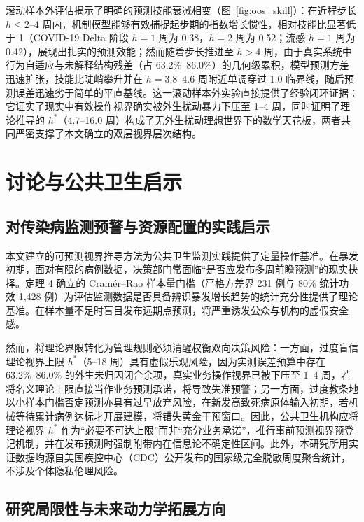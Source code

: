 \documentclass[11pt,a4paper]{article}
\theoremstyle{plain}
\theoremstyle{definition}
\begin{document}
滚动样本外评估揭示了明确的预测技能衰减相变（图~\ref{fig:oos_skill}）：在近程步长 $h \le 2\text{--}4$ 周内，机制模型能够有效捕捉起步期的指数增长惯性，相对技能比显著低于 1（COVID-19 Delta 阶段 $h=1$ 周为 0.38，$h=2$ 周为 0.52；流感 $h=1$ 周为 0.42），展现出扎实的预测效能；然而随着步长推进至 $h > 4$ 周，由于真实系统中行为自适应与未解释结构残差（占 63.2\%--86.0\%）的几何级累积，模型预测方差迅速扩张，技能比陡峭攀升并在 $h = 3.8\text{--}4.6$ 周附近单调穿过 1.0 临界线，随后预测误差迅速劣于简单的平直基线。这一滚动样本外实验直接提供了经验闭环证据：它证实了现实中有效操作视界确实被外生扰动暴力下压至 1--4 周，同时证明了理论推导的 $h^*$（4.7--16.0 周）构成了无外生扰动理想世界下的数学天花板，两者共同严密支撑了本文确立的双层视界层次结构。

\section{讨论与公共卫生启示}

\subsection{对传染病监测预警与资源配置的实践启示}

本文建立的可预测视界推导方法为公共卫生监测实践提供了定量操作基准。在暴发初期，面对有限的病例数据，决策部门常面临“是否应发布多周前瞻预测”的现实抉择。定理 4 确立的 Cram\'er--Rao 样本量门槛（严格方差界 231 例与 80\% 统计功效 1,428 例）为评估监测数据是否具备辨识暴发增长趋势的统计充分性提供了理论基准。在样本量不足时盲目发布远期点预测，将严重诱发公众与机构的虚假安全感。

然而，将理论界限转化为管理规则必须清醒权衡双向决策风险：一方面，过度盲信理论视界上限 $h^*$（5--18 周）具有虚假乐观风险，因为实测误差预算中存在 63.2\%--86.0\% 的外生未归因闭合余项，真实业务操作视界已被下压至 1--4 周，若将名义理论上限直接当作业务预测承诺，将导致失准预警；另一方面，过度教条地以小样本门槛否定预测亦具有过早放弃风险，在新发高致死病原体输入初期，若机械等待累计病例达标才开展建模，将错失黄金干预窗口。因此，公共卫生机构应将理论视界 $h^*$ 作为“必要不可达上限”而非“充分业务承诺”，推行事前预测视界预登记机制，并在发布预测时强制附带内在信息论不确定性区间。此外，本研究所用实证数据均源自美国疾控中心（CDC）公开发布的国家级完全脱敏周度聚合统计，不涉及个体隐私伦理风险。

\subsection{研究局限性与未来动力学拓展方向}
\end{document}

